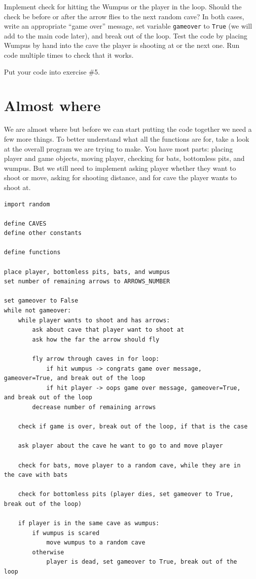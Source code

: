 \documentclass[
]{book}
\begin{document}
Implement check for hitting the Wumpus or the player in the loop. Should the check be before or after the arrow flies to the next random cave? In both cases, write an appropriate ``game over'' message, set variable \texttt{gameover} to \texttt{True} (we will add to the main code later), and break out of the loop. Test the code by placing Wumpus by hand into the cave the player is shooting at or the next one. Run code multiple times to check that it works.

Put your code into exercise \#5.

\hypertarget{almost-where}{%
\section{Almost where}\label{almost-where}}

We are almost where but before we can start putting the code together we need a few more things. To better understand what all the functions are for, take a look at the overall program we are trying to make. You have most parts: placing player and game objects, moving player, checking for bats, bottomless pits, and wumpus. But we still need to implement asking player whether they want to shoot or move, asking for shooting distance, and for cave the player wants to shoot at.

\begin{verbatim}
import random

define CAVES
define other constants

define functions 

place player, bottomless pits, bats, and wumpus
set number of remaining arrows to ARROWS_NUMBER

set gameover to False
while not gameover:
    while player wants to shoot and has arrows:
        ask about cave that player want to shoot at
        ask how the far the arrow should fly
        
        fly arrow through caves in for loop:
            if hit wumpus -> congrats game over message, gameover=True, and break out of the loop
            if hit player -> oops game over message, gameover=True, and break out of the loop
        decrease number of remaining arrows
        
    check if game is over, break out of the loop, if that is the case
        
    ask player about the cave he want to go to and move player
    
    check for bats, move player to a random cave, while they are in the cave with bats
    
    check for bottomless pits (player dies, set gameover to True, break out of the loop)
    
    if player is in the same cave as wumpus:
        if wumpus is scared
            move wumpus to a random cave
        otherwise
            player is dead, set gameover to True, break out of the loop
\end{verbatim}
\end{document}
